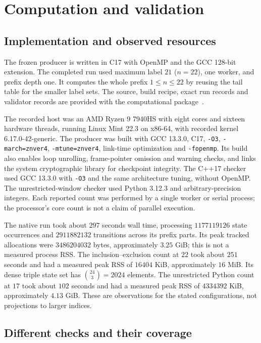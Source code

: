 \documentclass[11pt]{article}
\theoremstyle{definition}
\theoremstyle{remark}
\begin{document}
\section{Computation and validation}
\label{sec:validation}

\subsection{Implementation and observed resources}

The frozen producer is written in C17 with OpenMP and the GCC 128-bit
extension. The completed run used maximum label $21$ ($n=22$), one worker,
and prefix depth one. It computes the whole prefix $1\leq n\leq22$ by
reusing the tail table for the smaller label sets. The source, build recipe,
exact run records and validator records are provided with the computational
package~\cite{corti}.

The recorded host was an AMD Ryzen 9 7940HS with eight cores and sixteen
hardware threads, running Linux Mint 22.3 on x86-64, with recorded kernel
6.17.0-42-generic. The producer
was built with GCC 13.3.0, C17, \texttt{-O3}, \texttt{-march=znver4},
\texttt{-mtune=znver4}, link-time optimization and \texttt{-fopenmp}.
Its build also enables loop unrolling, frame-pointer omission and warning
checks, and links the system cryptographic library for checkpoint integrity.
The C++17 checker used GCC 13.3.0 with \texttt{-O3} and the same architecture
tuning, without OpenMP. The unrestricted-window checker used Python 3.12.3
and arbitrary-precision integers. Each reported count was performed by a
single worker or serial process; the processor's core count is not a claim
of parallel execution.

The native run took about $297$ seconds wall time, processing
$1177119126$ state occurrences and $2911882132$ transitions
across its prefix parts. Its peak tracked allocations were $3486204032$
bytes, approximately $3.25$ GiB; this is not a measured process RSS.
The inclusion--exclusion count at $22$ took about $251$ seconds and had a
measured peak RSS of $16404$ KiB, approximately $16$ MiB. Its dense triple
state set has $\binom{24}{3}=2024$ elements. The unrestricted Python count
at $17$ took about $102$ seconds and had a measured peak RSS of
$4334392$ KiB, approximately $4.13$ GiB. These are observations for the
stated configurations, not projections to larger indices.

\subsection{Different checks and their coverage}
\end{document}
